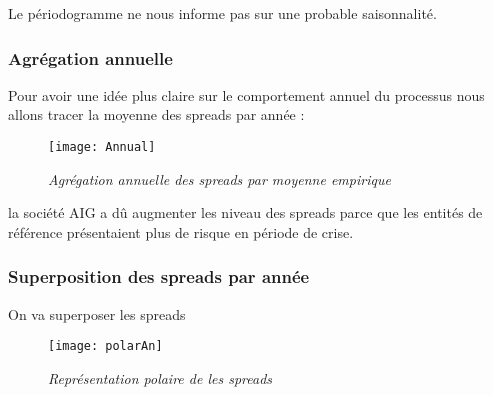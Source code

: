     Le périodogramme ne nous informe pas sur une probable saisonnalité.

        \subsubsection{Agrégation annuelle}
            Pour avoir une idée plus claire sur le comportement annuel du
            processus nous allons tracer la moyenne des spreads par année :
            \begin{figure}[H]
                \centering 
                \label{fig:annual} 
                \texttt{[image: Annual]} 
                \caption{\it Agrégation annuelle des spreads par moyenne empirique } 
            \end{figure} 
             la société AIG a dû
            augmenter les niveau des spreads parce que les
            entités de référence présentaient plus de risque  en période de
            crise. 




            \subsubsection{Superposition des spreads par année} 
            On va superposer les spreads
        \begin{figure}[H]
            \centering 
            \label{fig:polarAn} 
            \texttt{[image: polarAn]} 
            \caption{\it Représentation polaire de les spreads } 
        \end{figure} 


